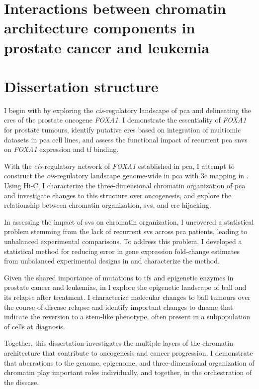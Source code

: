 \section{Interactions between chromatin architecture components in prostate cancer and leukemia}

\section{Dissertation structure}

I begin with  by exploring the \emph{cis}-regulatory landscape of \gls{pca} and delineating the \glspl{cre} of the prostate oncogene \emph{FOXA1}.
I demonstrate the essentiality of \emph{FOXA1} for prostate tumours, identify putative \glspl{cre} based on integration of multiomic datasets in \gls{pca} cell lines, and assess the functional impact of recurrent \gls{pca} \glspl{snv} on \emph{FOXA1} expression and \gls{tf} binding.

With the \emph{cis}-regulatory network of \emph{FOXA1} established in \gls{pca}, I attempt to construct the \emph{cis}-regulatory landscape genome-wide in \gls{pca} with \gls{3c} mapping in .
Using Hi-C, I characterize the three-dimensional chromatin organization of \gls{pca} and investigate changes to this structure over oncogenesis, and explore the relationship between chromatin organization, \glspl{sv}, and \gls{cre} hijacking.

In assessing the impact of \glspl{sv} on chromatin organization, I uncovered a statistical problem stemming from the lack of recurrent \glspl{sv} across \gls{pca} patients, leading to unbalanced experimental comparisons.
To address this problem, I developed a statistical method for reducing error in gene expression fold-change estimates from unbalanced experimental designs in  and characterize the method.

Given the shared importance of mutations to \glspl{tf} and epigenetic enzymes in prostate cancer and leukemias, in  I explore the epigenetic landscape of \gls{ball} and its relapse after treatment.
I characterize molecular changes to \gls{ball} tumours over the course of disease relapse and identify important changes to \gls{dname} that indicate the reversion to a stem-like phenotype, often present in a subpopulation of cells at diagnosis.

Together, this dissertation investigates the multiple layers of the chromatin architecture that contribute to oncogenesis and cancer progression.
I demonstrate that aberrations to the genome, epigenome, and three-dimensional organization of chromatin play important roles individually, and together, in the orchestration of the disease.
